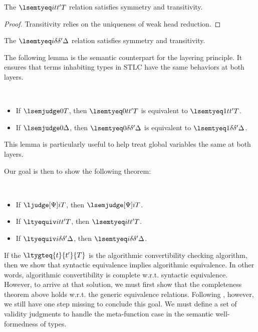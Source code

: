 \begin{lemma}[PER]
  The $\lsemtyeq i {t}{t'} T$ relation satisfies symmetry and transitivity.
\end{lemma}
\begin{proof}
  Transitivity relies on the uniqueness of weak head reduction. 
\end{proof}
\begin{lemma}[PER]
  The $\lsemtyeq i {\delta}{\delta'} \Delta$ relation satisfies symmetry and transitivity.
\end{lemma}

The following lemma is the semantic counterpart for the layering principle. %
It ensures that terms inhabiting types in STLC have the same behaviors at both layers.
\begin{lemma} $ $
  \begin{itemize}
  \item If $\lsemjudge 0 T$, then $\lsemtyeq 0 t{t'} T$ is equivalent to $\lsemtyeq 1 t{t'} T$.
  \item If $\lsemjudge 0 \Delta$, then $\lsemtyeq 0 \delta{\delta'} \Delta$ is
    equivalent to $\lsemtyeq 1 \delta{\delta'} \Delta$.
  \end{itemize}
\end{lemma}
This lemma is particularly useful to help treat global variables the same at both layers.

Our goal is then to show the following theorem:
\begin{theorem}[Completeness] $ $
  \begin{itemize}
  \item If $\ljudge[\Psi] i T$, then $\lsemjudge[\Psi] i T$.
  \item If $\ltyequiv i {t}{t'} T$, then $\lsemtyeq i {t}{t'} T$.
  \item If $\ltyequiv i {\delta}{\delta'} \Delta$, then $\lsemtyeq i {\delta}{\delta'} \Delta$.
  \end{itemize}
\end{theorem}
If the $\ltygteq{t}{t'}{T}$ is the algorithmic convertibility checking algorithm, then
we show that syntactic equivalence implies algorithmic equivalence. %
In other words, algorithmic convertibility is complete w.r.t. syntactic equivalence. %
However, to arrive at that solution, we must first show that the completeness theorem
above holds w.r.t. the generic equivalence relations. %
Following \citet{abel_decidability_2017}, however, we still have one step missing to
conclude this goal. %
We must define a set of validity judgments to handle the meta-function case in the
semantic well-formedness of types.

